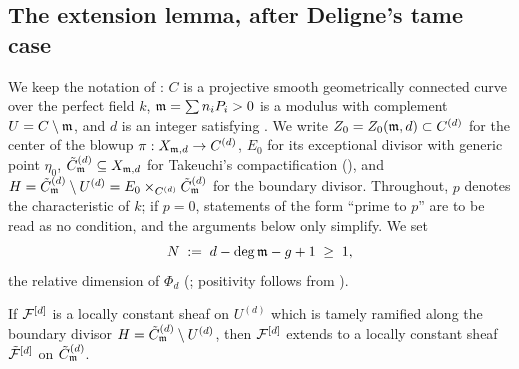%

\subsection*{The extension lemma, after Deligne's tame case}

We keep the notation of :
$C$ is a projective smooth geometrically connected curve over the perfect field $k$,
$\mathfrak{m} = \sum n_i P_i > 0$ is a modulus with complement $U = C \setminus \mathfrak{m}$,
and $d$ is an integer satisfying .
We write $Z_0 = Z_0(\mathfrak{m}, d) \subset C^{(d)}$ for the center of the blowup
$\pi : X_{\mathfrak{m}, d} \to C^{(d)}$, $E_0$ for its exceptional divisor with generic point $\eta_0$,
$\tilde{C}_{\mathfrak{m}}^{(d)} \subseteq X_{\mathfrak{m},d}$ for Takeuchi's compactification
(), and
$H = \tilde{C}_{\mathfrak{m}}^{(d)} \setminus U^{(d)} = E_0 \times_{C^{(d)}} \tilde{C}_{\mathfrak{m}}^{(d)}$ for the boundary divisor.
Throughout, $p$ denotes the characteristic of $k$; if $p = 0$, statements of the form
``prime to $p$'' are to be read as no condition, and the arguments below only simplify.
We set
\[
N \;:=\; d - \deg\mathfrak{m} - g + 1 \;\geq\; 1,
\]
the relative dimension of $\Phi_d$ (; positivity
follows from ).

\begin{lemma}\label{lemma:ExtensionOfTamelyRamifiedSheafShort}
    If $\mathcal{F}^{[d]}$ is a locally constant sheaf on $U^{(d)}$ which is tamely ramified along the
    boundary divisor $H = \tilde{C}^{(d)}_{\mathfrak{m}} \setminus U^{(d)}$,
    then $\mathcal{F}^{[d]}$ extends to a locally constant sheaf $\tilde{\mathcal{F}}^{[d]}$ on
    $\tilde{C}^{(d)}_{\mathfrak{m}}$.
\end{lemma}

